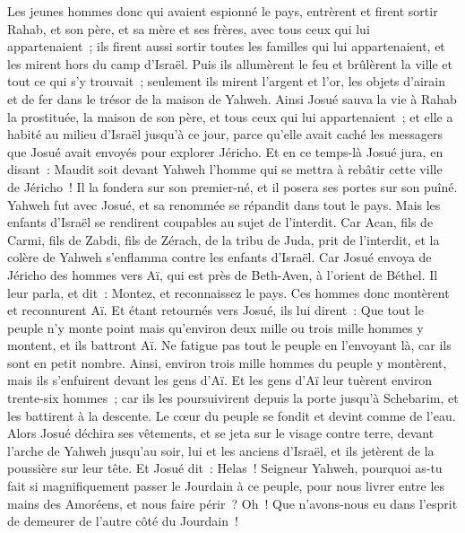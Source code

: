 \begin{multicols}{2}
Les jeunes hommes donc qui avaient espionné le pays, entrèrent et firent sortir Rahab, et son père, et sa mère et ses frères, avec tous ceux qui lui appartenaient~; ils firent aussi sortir toutes les familles qui lui appartenaient, et les mirent hors du camp d'Israël.
Puis ils allumèrent le feu et brûlèrent la ville et tout ce qui s'y trouvait~; seulement ils mirent l'argent et l'or, les objets d'airain et de fer dans le trésor de la maison de Yahweh.
Ainsi Josué sauva la vie à Rahab la prostituée, la maison de son père, et tous ceux qui lui appartenaient~; et elle a habité au milieu d'Israël jusqu'à ce jour, parce qu'elle avait caché les messagers que Josué avait envoyés pour explorer Jéricho.
Et en ce temps-là Josué jura, en disant~: Maudit soit devant Yahweh l'homme qui se mettra à rebâtir cette ville de Jéricho~! Il la fondera sur son premier-né, et il posera ses portes sur son puîné.
Yahweh fut avec Josué, et sa renommée se répandit dans tout le pays.
\VerseOne{}Mais les enfants d'Israël se rendirent coupables au sujet de l'interdit. Car Acan, fils de Carmi, fils de Zabdi, fils de Zérach, de la tribu de Juda, prit de l'interdit, et la colère de Yahweh s'enflamma contre les enfants d'Israël.
Car Josué envoya de Jéricho des hommes vers Aï, qui est près de Beth-Aven, à l'orient de Béthel. Il leur parla, et dit~: Montez, et reconnaissez le pays. Ces hommes donc montèrent et reconnurent Aï.
Et étant retournés vers Josué, ils lui dirent~: Que tout le peuple n'y monte point mais qu'environ deux mille ou trois mille hommes y montent, et ils battront Aï. Ne fatigue pas tout le peuple en l'envoyant là, car ils sont en petit nombre.
Ainsi, environ trois mille hommes du peuple y montèrent, mais ils s'enfuirent devant les gens d'Aï.
Et les gens d'Aï leur tuèrent environ trente-six hommes~; car ils les poursuivirent depuis la porte jusqu'à Schebarim, et les battirent à la descente. Le cœur du peuple se fondit et devint comme de l'eau.
Alors Josué déchira ses vêtements, et se jeta sur le visage contre terre, devant l'arche de Yahweh jusqu'au soir, lui et les anciens d'Israël, et ils jetèrent de la poussière sur leur tête.
Et Josué dit~: Helas~! Seigneur Yahweh, pourquoi as-tu fait si magnifiquement passer le Jourdain à ce peuple, pour nous livrer entre les mains des Amoréens, et nous faire périr~? Oh~! Que n'avons-nous eu dans l'esprit de demeurer de l'autre côté du Jourdain~!

\end{multicols}
